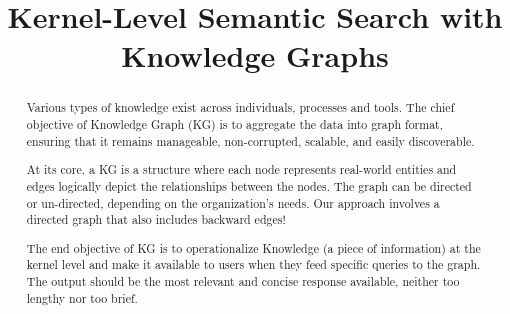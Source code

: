 \documentclass[conference]{IEEEtran}
\begin{document}
\title{ Kernel-Level Semantic Search with Knowledge Graphs
}

\author{\IEEEauthorblockN{}
\and
{}
\and
{}
\and
{}
}

\maketitle

\begin{abstract}
Various types of knowledge exist across individuals, processes and tools.
The chief objective of Knowledge Graph (KG) is to aggregate the data into graph format, ensuring that it remains manageable, non-corrupted, scalable, and easily discoverable.

At its core, a KG is a structure where each node represents real-world entities and edges logically depict the relationships between the nodes. The graph can be directed or un-directed, depending on the organization's needs. Our approach involves a directed graph that also includes backward edges!

The end objective of KG is to operationalize Knowledge (a piece of information) at the kernel level and make it available to users when they feed specific queries to the graph. The output should be the most relevant and concise response available, neither too lengthy nor too brief.
\end{abstract}

\end{document}
